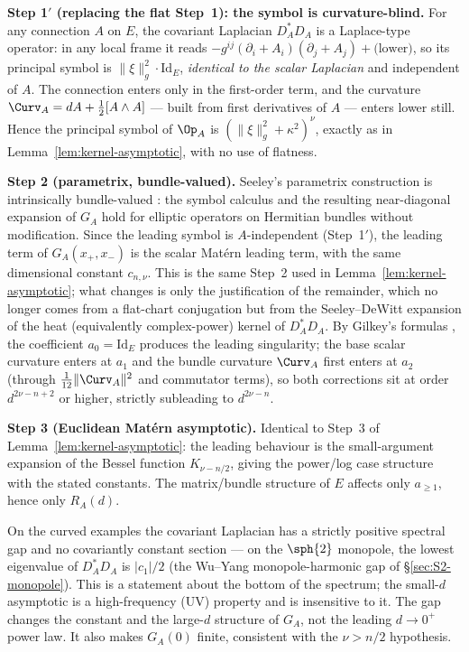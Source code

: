 \begin{proofsketch}
\textbf{Step 1$'$ (replacing the flat Step~1): the symbol is
curvature-blind.} For any connection $A$ on $E$, the covariant
Laplacian $D_A^*D_A$ is a Laplace-type operator: in any local frame
it reads $-g^{ij}(\partial_i+A_i)(\partial_j+A_j)+\text{(lower)}$, so
its principal symbol is $\|\xi\|_g^2\cdot\mathrm{Id}_E$, \emph{identical
to the scalar Laplacian} and independent of $A$. The connection enters
only in the first-order term, and the curvature
$\Curv_A=dA+\tfrac12[A\wedge A]$ --- built from first derivatives of
$A$ --- enters lower still. Hence the principal symbol of $\Op_A$ is
$(\|\xi\|_g^2+\kappa^2)^\nu$, exactly as in
Lemma~\ref{lem:kernel-asymptotic}, with no use of flatness.

\textbf{Step 2 (parametrix, bundle-valued).} Seeley's parametrix
construction is intrinsically bundle-valued
\cite{Seeley1967,Gilkey1995}: the symbol calculus and the resulting
near-diagonal expansion of $G_A$ hold for elliptic operators on
Hermitian bundles without modification. Since the leading symbol is
$A$-independent (Step~1$'$), the leading term of $G_A(x_+,x_-)$ is the
scalar Mat\'ern leading term, with the same dimensional constant
$c_{n,\nu}$. This is the same Step~2 used in
Lemma~\ref{lem:kernel-asymptotic}; what changes is only the
justification of the remainder, which no longer comes from a
flat-chart conjugation but from the Seeley--DeWitt expansion of the
heat (equivalently complex-power) kernel of $D_A^*D_A$. By Gilkey's
formulas \cite{Gilkey1995}, the coefficient $a_0=\mathrm{Id}_E$
produces the leading singularity; the base scalar curvature enters at
$a_1$ and the bundle curvature $\Curv_A$ first enters at $a_2$
(through $\tfrac{1}{12}\|\Curv_A\|^2$ and commutator terms), so both
corrections sit at order $d^{2\nu-n+2}$ or higher, strictly subleading
to $d^{2\nu-n}$.

\textbf{Step 3 (Euclidean Mat\'ern asymptotic).} Identical to Step~3
of Lemma~\ref{lem:kernel-asymptotic}: the leading behaviour is the
small-argument expansion of the Bessel function $K_{\nu-n/2}$, giving
the power/log case structure with the stated constants. The
matrix/bundle structure of $E$ affects only $a_{\geq 1}$, hence only
$R_A(d)$.
\end{proofsketch}

\begin{remark}
\label{rem:spectral-gap}
On the curved examples the covariant Laplacian has a strictly positive
spectral gap and no covariantly constant section --- on the
$\sph{2}$ monopole, the lowest eigenvalue of $D_A^*D_A$ is
$|c_1|/2$ (the Wu--Yang monopole-harmonic gap of
\S\ref{sec:S2-monopole}). This is a statement about the bottom of the
spectrum; the small-$d$ asymptotic is a high-frequency (UV) property
and is insensitive to it. The gap changes the constant and the
large-$d$ structure of $G_A$, not the leading $d\to 0^+$ power law. It
also makes $G_A(0)$ finite, consistent with the $\nu>n/2$ hypothesis.
\end{remark}

